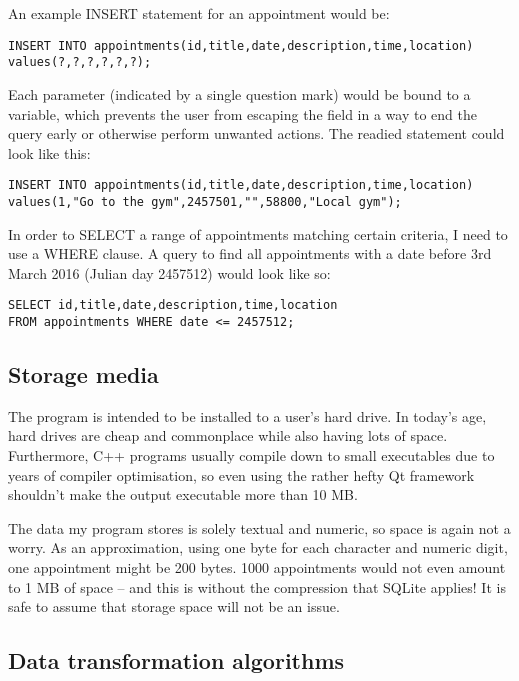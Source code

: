 An example INSERT statement for an appointment would be:

\begin{verbatim}
INSERT INTO appointments(id,title,date,description,time,location)
values(?,?,?,?,?,?);
\end{verbatim}

Each parameter (indicated by a single question mark) would be bound to a
variable, which prevents the user from escaping the field in a way to end the
query early or otherwise perform unwanted actions. The readied statement could look like this:

\begin{verbatim}
INSERT INTO appointments(id,title,date,description,time,location)
values(1,"Go to the gym",2457501,"",58800,"Local gym");
\end{verbatim}

In order to SELECT a range of appointments matching certain criteria, I need to
use a WHERE clause. A query to find all appointments with a date before 3rd
March 2016 (Julian day 2457512) would look like so:

\begin{verbatim}
SELECT id,title,date,description,time,location
FROM appointments WHERE date <= 2457512;
\end{verbatim}


\subsection{Storage media}

The program is intended to be installed to a user's hard drive. In today's age,
hard drives are cheap and commonplace while also having lots of space.
Furthermore, C++ programs usually compile down to small executables due to years
of compiler optimisation, so even using the rather hefty Qt framework shouldn't
make the output executable more than 10 MB.

The data my program stores is solely textual and numeric, so space is again not
a worry. As an approximation, using one byte for each character and numeric
digit, one appointment might be 200 bytes. 1000 appointments would not even
amount to 1 MB of space -- and this is without the compression that SQLite
applies! It is safe to assume that storage space will not be an issue.


\subsection{Data transformation algorithms}

